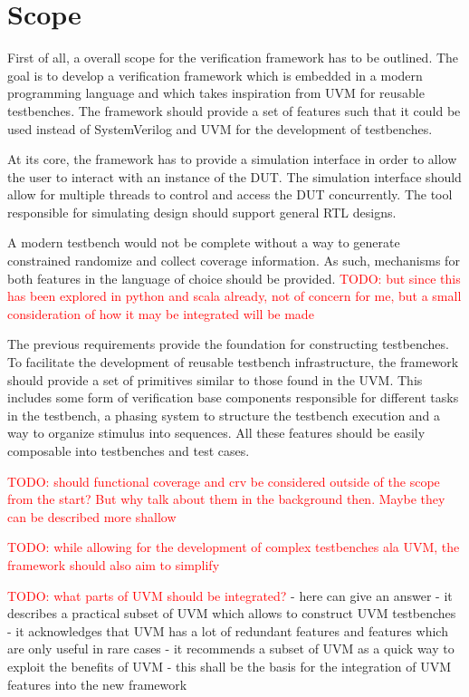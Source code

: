 \documentclass[11pt,a4paper]{report}
\newcommand{\todo}[1]{\textcolor{red}{TODO: #1}}
\begin{document}
\section{Scope} %

First of all, a overall scope for the verification framework has to be outlined. The goal is to develop a
verification framework which is embedded in a modern programming language and which takes inspiration from UVM for
reusable testbenches. The framework should provide a set of features such that it could be used instead of
SystemVerilog and UVM for the development of testbenches.

At its core, the framework has to provide a simulation interface in order to allow the user to interact with an
instance of the DUT. The simulation interface should allow for multiple threads to control and access the DUT
concurrently. The tool responsible for simulating design should support general RTL designs.

A modern testbench would not be complete without a way to generate constrained randomize and collect coverage
information. As such, mechanisms for both features in the language of choice should be provided. \todo{but since this
  has been explored in python and scala already, not of concern for me, but a small consideration of how it may be
integrated will be made}

The previous requirements provide the foundation for constructing testbenches. To facilitate the development of
reusable testbench infrastructure, the framework should provide a set of primitives similar to those found in the
UVM. This includes some form of verification base components responsible for different tasks in the testbench, a
phasing system to structure the testbench execution and a way to organize stimulus into sequences. All these features
should be easily composable into testbenches and test cases.

\todo{should functional coverage and crv be considered outside of the scope from the start? But why talk about them
in the background then. Maybe they can be described more shallow}

\todo{while allowing for the development of complex testbenches ala UVM, the framework should also aim to simplify}

\todo{what parts of UVM should be integrated?}
- here \cite{sutherland2015uvm} can give an answer
- it describes a practical subset of UVM which allows to construct UVM testbenches
- it acknowledges that UVM has a lot of redundant features and features which are only useful in rare cases
- it recommends a subset of UVM as a quick way to exploit the benefits of UVM
- this shall be the basis for the integration of UVM features into the new framework
\end{document}
